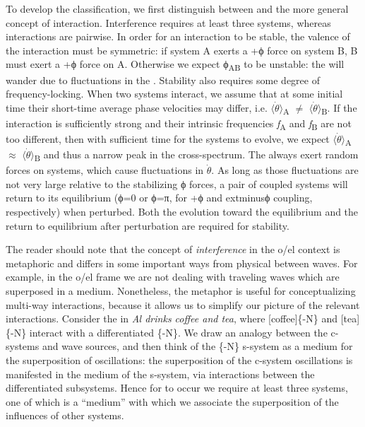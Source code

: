   To develop the classification, we first distinguish between  and the more general concept of interaction. Interference requires at least three systems, whereas interactions are pairwise. In order for an interaction to be stable, the valence of the interaction must be symmetric: if system A exerts a +ϕ force on system B, B must exert a +ϕ force on A. Otherwise we expect ϕ\textsubscript{AB} to be unstable: the  will wander due to fluctuations in the . Stability also requires some degree of frequency-locking. When two systems interact, we assume that at some initial time their short-time average phase velocities may differ, i.e. $\langle\dot{\theta}\rangle$\textsubscript{A} ${\neq}$ $\langle\dot{\theta}\rangle$\textsubscript{B}. If the interaction is sufficiently strong and their intrinsic frequencies \textit{f}\textsubscript{A} and \textit{f}\textsubscript{B} are not too different, then with sufficient time for the systems to evolve, we expect $\langle\dot{\theta}\rangle$\textsubscript{A} ${\approx}$ $\langle\dot{\theta}\rangle$\textsubscript{B} and thus a narrow peak in the cross-spectrum. The  always exert random forces on systems, which cause fluctuations in  $\dot{\theta}$. As long as those fluctuations are not very large relative to the stabilizing ϕ forces, a pair of coupled systems will return to its equilibrium (ϕ=0 or ϕ=π, for +ϕ and 	extminus{}ϕ coupling, respectively) when perturbed. Both the evolution toward the equilibrium and the return to equilibrium after perturbation are required for stability.

  The reader should note that the concept of \textit{interference} in the o/el context is metaphoric and differs in some important ways from physical  between waves. For example, in the o/el frame we are not dealing with traveling waves which are superposed in a medium. Nonetheless, the metaphor is useful for conceptualizing multi-way interactions, because it allows us to simplify our picture of the relevant interactions. Consider the  in \textit{Al drinks coffee and tea}, where [coffee]\{-N\} and [tea]\{-N\} interact with a differentiated \{-N\}. We draw an analogy between the c-systems and wave sources, and then think of the \{-N\} s-system as a medium for the superposition of oscillations: the superposition of the c-system oscillations is manifested in the medium of the s-system, via interactions between the differentiated subsystems. Hence for  to occur we require at least three systems, one of which is a “medium” with which we associate the superposition of the influences of other systems. 

